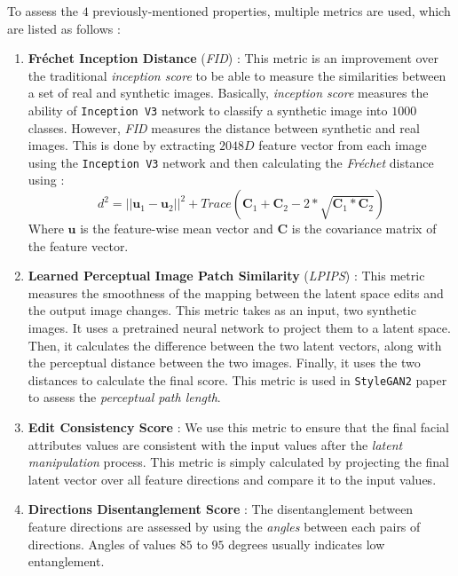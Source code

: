 To assess the $4$ previously-mentioned properties, multiple metrics are used, which are listed as follows :
\begin{enumerate}
    \item \textbf{Fréchet Inception Distance} (\emph{FID}) \cite{heusel2018gans} : This metric is an improvement over the traditional \emph{inception score} to be able to measure the similarities between a set of real and synthetic images. Basically, \emph{inception score} measures the ability of \texttt{Inception V3} network \cite{szegedy2014going} to classify a synthetic image into $1000$ classes. However, \emph{FID} measures the distance between synthetic and real images. This is done by extracting $2048D$ feature vector from each image using the \texttt{Inception V3} network and then calculating the \emph{Fréchet} distance using :
    \begin{equation}
        d^2 = ||\textbf{u}_{1} - \textbf{u}_{2}||^2 + Trace(\textbf{C}_{1} + \textbf{C}_{2} - 2 * \sqrt{\textbf{C}_{1} * \textbf{C}_{2}})
    \end{equation}
    Where $\textbf{u}$ is the feature-wise mean vector and $\textbf{C}$ is the covariance matrix of the feature vector.
    
    \item \textbf{Learned Perceptual Image Patch Similarity} (\emph{LPIPS}) \cite{zhang2018unreasonable} : This metric measures the smoothness of the mapping between the latent space edits and the output image changes. This metric takes as an input, two synthetic images. It uses a pretrained neural network to project them to a latent space. Then, it calculates the difference between the two latent vectors, along with the perceptual distance between the two images. Finally, it uses the two distances to calculate the final score. This metric is used in \texttt{StyleGAN2} paper to assess the \emph{perceptual path length}.
    
    \item \textbf{Edit Consistency Score} : We use this metric to ensure that the final facial attributes values are consistent with the input values after the \emph{latent manipulation} process. This metric is simply calculated by projecting the final latent vector over all feature directions and compare it to the input values.
    
    \item \textbf{Directions Disentanglement Score} : The disentanglement between feature directions are assessed by using the \emph{angles} between each pairs of directions. Angles of values $85$ to $95$ degrees usually indicates low entanglement.
\end{enumerate}

